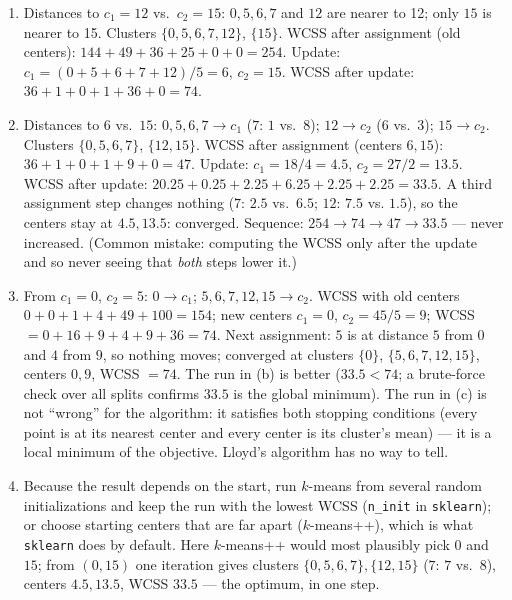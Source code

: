 \documentclass[
  11pt,
]{article}
\newcommand{\answerspace}[1]{\par\vspace*{#1}}  %
\begin{document}
\answerspace{1.8in}

\begin{solutionbox}

\begin{enumerate}
\def\labelenumi{(\alph{enumi})}
\item
  Distances to \(c_1=12\) vs.~\(c_2=15\): \(0,5,6,7\) and \(12\) are
  nearer to 12; only \(15\) is nearer to 15. Clusters
  \(\{0,5,6,7,12\}\), \(\{15\}\). WCSS after assignment (old centers):
  \(144+49+36+25+0+0 = 254\). Update: \(c_1 = (0+5+6+7+12)/5 = 6\),
  \(c_2 = 15\). WCSS after update: \(36+1+0+1+36+0 = 74\).
\item
  Distances to \(6\) vs.~\(15\): \(0,5,6,7 \to c_1\) (\(7\): \(1\)
  vs.~\(8\)); \(12 \to c_2\) (\(6\) vs.~\(3\)); \(15\to c_2\). Clusters
  \(\{0,5,6,7\}\), \(\{12,15\}\). WCSS after assignment (centers
  \(6,15\)): \(36+1+0+1+9+0 = 47\). Update: \(c_1 = 18/4 = 4.5\),
  \(c_2 = 27/2 = 13.5\). WCSS after update:
  \(20.25+0.25+2.25+6.25+2.25+2.25 = 33.5\). A third assignment step
  changes nothing (\(7\): \(2.5\) vs.~\(6.5\); \(12\): \(7.5\) vs.
  \(1.5\)), so the centers stay at \(4.5, 13.5\): converged. Sequence:
  \(254 \to 74 \to 47 \to 33.5\) --- never increased. (Common mistake:
  computing the WCSS only after the update and so never seeing that
  \emph{both} steps lower it.)
\item
  From \(c_1=0\), \(c_2=5\): \(0\to c_1\); \(5,6,7,12,15 \to c_2\). WCSS
  with old centers \(0+0+1+4+49+100 = 154\); new centers \(c_1 = 0\),
  \(c_2 = 45/5 = 9\); WCSS \(=0+16+9+4+9+36 = 74\). Next assignment:
  \(5\) is at distance \(5\) from \(0\) and \(4\) from \(9\), so nothing
  moves; converged at clusters \(\{0\}\), \(\{5,6,7,12,15\}\), centers
  \(0, 9\), WCSS \(= 74\). The run in (b) is better (\(33.5 < 74\); a
  brute-force check over all splits confirms \(33.5\) is the global
  minimum). The run in (c) is not ``wrong'' for the algorithm: it
  satisfies both stopping conditions (every point is at its nearest
  center and every center is its cluster's mean) --- it is a local
  minimum of the objective. Lloyd's algorithm has no way to tell.
\item
  Because the result depends on the start, run \(k\)-means from several
  random initializations and keep the run with the lowest WCSS
  (\texttt{n\_init} in \texttt{sklearn}); or choose starting centers
  that are far apart (\(k\)-means++), which is what \texttt{sklearn}
  does by default. Here \(k\)-means++ would most plausibly pick \(0\)
  and \(15\); from \((0,15)\) one iteration gives clusters
  \(\{0,5,6,7\},\{12,15\}\) (\(7\): \(7\) vs.~\(8\)), centers
  \(4.5, 13.5\), WCSS \(33.5\) --- the optimum, in one step.
\end{enumerate}

\end{solutionbox}
\end{document}
